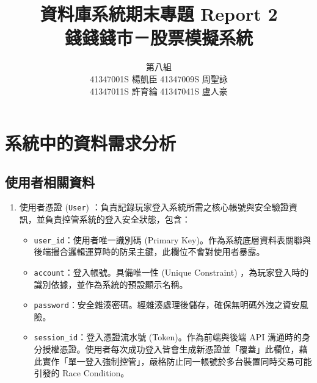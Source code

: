 \documentclass[UTF8, a4paper, 12pt, fontset=none]{ctexart}
\title{資料庫系統期末專題 Report 2\\ \textbf{錢錢錢市－股票模擬系統}}
\author{
    \begin{tabular}{c}
        第八組 \\ 
        41347001S 楊凱臣 \quad 41347009S 周聖詠 \\ 
        41347011S 許育綸 \quad 41347041S 盧人豪
    \end{tabular}
}
\date{}
\begin{document}
\maketitle
    \section {系統中的資料需求分析}
    \subsection{使用者相關資料}
    \begin{enumerate}
        \item 使用者憑證 (\texttt{User}) ：負責記錄玩家登入系統所需之核心帳號與安全驗證資訊，並負責控管系統的登入安全狀態，包含：
        \begin{itemize}
            \item \texttt{user\_id}：使用者唯一識別碼 (Primary Key)。作為系統底層資料表關聯與後端撮合邏輯運算時的防呆主鍵，此欄位不會對使用者暴露。
            \item \texttt{account}：登入帳號。具備唯一性 (Unique Constraint) ，為玩家登入時的識別依據，並作為系統的預設顯示名稱。
            \item \texttt{password}：安全雜湊密碼。經雜湊處理後儲存，確保無明碼外洩之資安風險。
            \item \texttt{session\_id}：登入憑證流水號 (Token)。作為前端與後端 API 溝通時的身分授權憑證。使用者每次成功登入皆會生成新憑證並「覆蓋」此欄位，藉此實作「單一登入強制控管」，嚴格防止同一帳號於多台裝置同時交易可能引發的 Race Condition。
        \end{itemize}
    \end{enumerate}
\end{document}
